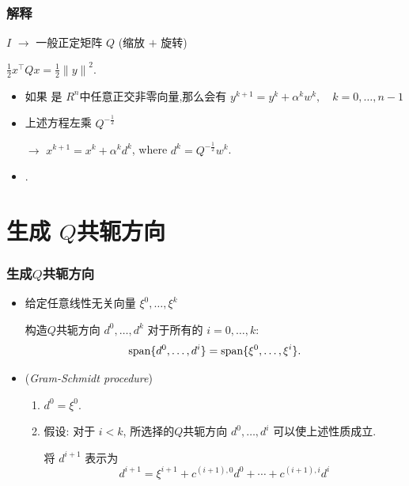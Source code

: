 \documentclass{beamer}
\begin{document}
	\begin{frame}
		\frametitle{解释}
		
		
		$I$ $\rightarrow $ 一般正定矩阵 $Q$  (缩放 $+$ 旋转)
		
		  $\frac{1}{2}x^{\top}Qx = \frac{1}{2}{\parallel y \parallel}^2$.
		
		
		\begin{itemize}
			\item 如果 是 $R^n$中任意正交非零向量,那么会有 %
			$y^{k+1}=y^k+{\alpha}^kw^k,\quad k=0,\dots,n-1$
			
			\item 上述方程左乘 $Q^{-\frac{1}{2}}$
			
			$\rightarrow$ $x^{k+1}=x^k+{\alpha}^kd^k$, where $d^k=Q^{-\frac{1}{2}}w^k$.
			\item   {}.
			
			
		\end{itemize}
		
		
	\end{frame}
	\section{生成 $Q$共轭方向}
	\begin{frame}
		\frametitle{\secno 生成$Q$共轭方向}
		
		\begin{itemize}
			\item {} 给定任意线性无关向量 ${\xi}^0,\dots,{\xi}^k$
			
			构造$Q$共轭方向 $d^0,\dots,d^k$ 对于所有的 $i =0,\dots, k$:
			\begin{equation}
				\textnormal{span}\{ d^0,\dots,d^i\}= \textnormal{span}\{  \xi^0,\dots,{\xi}^i\}.
			\end{equation}
			
			
			\item {} (\emph{Gram-Schmidt procedure})
			\begin{enumerate}[(1)]
				\item $
				d^0={\xi}^0.
				$
				
				\item
				假设: 对于  $i < k$, 所选择的$Q$共轭方向 $d^0,\dots, d^i$ 可以使上述性质成立.
				
				将 $d^{i+1}$ 表示为
				\begin{equation}
					d^{i+1}={\xi}^{i+1}+  c^{(i+1),0}d^0 +\cdots + c^{(i+1),i}d^i
				\end{equation}
				
			\end{enumerate}
			
		\end{itemize}
	\end{frame}
	
\end{document}
